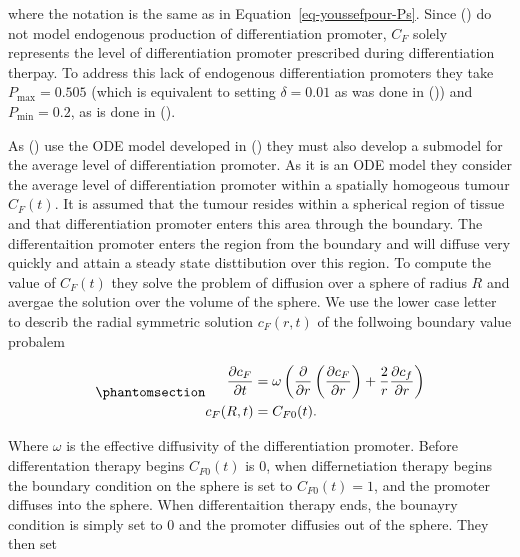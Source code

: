 \documentclass[
  letterpaper,
]{scrreprt}
\theoremstyle{definition}
\theoremstyle{remark}
\begin{document}
where the notation is the same as in Equation~\ref{eq-youssefpour-Ps}.
Since () do not model
endogenous production of differentiation promoter, \(C_F\) solely
represents the level of differentiation promoter prescribed during
differentiation therpay. To address this lack of endogenous
differentiation promoters they take \(P_\text{max} = 0.505\) (which is
equivalent to setting \(\delta = 0.01\) as was done in
()) and
\(P_\text{min} = 0.2\), as is done in
().

As () use the ODE
model developed in () they must also develop a submodel for the average level
of differentiation promoter. As it is an ODE model they consider the
average level of differentiation promoter within a spatially homogeous
tumour \(C_F(t)\). It is assumed that the tumour resides within a
spherical region of tissue and that differentiation promoter enters this
area through the boundary. The differentaition promoter enters the
region from the boundary and will diffuse very quickly and attain a
steady state disttibution over this region. To compute the value of
\(C_F(t)\) they solve the problem of diffusion over a sphere of radius
\(R\) and avergae the solution over the volume of the sphere. We use the
lower case letter to describ the radial symmetric solution \(c_F(r,t)\)
of the follwoing boundary value probalem

\begin{equation}\phantomsection\label{eq-bachman-CF}{
\begin{aligned}
\frac{\partial c_F}{\partial t} &= \omega \left( \frac{\partial}{\partial r} \left(\frac{\partial c_F}{\partial r} \right) + \frac{2}{r} \frac{\partial c_f}{\partial r}   \right) \\
c_F(R,t) &= C_{F0}(t).
\end{aligned}
}\end{equation}

Where \(\omega\) is the effective diffusivity of the differentiation
promoter. Before differentation therapy begins \(C_{F0}(t)\) is 0, when
differnetiation therapy begins the boundary condition on the sphere is
set to \(C_{F0}(t) = 1\), and the promoter diffuses into the sphere.
When differentaition therapy ends, the bounayry condition is simply set
to 0 and the promoter diffusies out of the sphere. They then set
\end{document}

